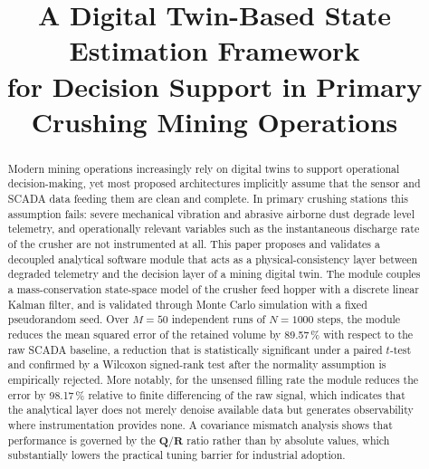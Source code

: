 \documentclass[conference]{IEEEtran}
\begin{document}
\title{A Digital Twin-Based State Estimation Framework\\
for Decision Support in Primary Crushing Mining Operations}

\author{
\and
{}
\and
{}
}

\maketitle

\begin{abstract}
Modern mining operations increasingly rely on digital twins to support
operational decision-making, yet most proposed architectures implicitly assume
that the sensor and SCADA data feeding them are clean and complete. In primary
crushing stations this assumption fails: severe mechanical vibration and
abrasive airborne dust degrade level telemetry, and operationally relevant
variables such as the instantaneous discharge rate of the crusher are not
instrumented at all. This paper proposes and validates a decoupled analytical
software module that acts as a physical-consistency layer between degraded
telemetry and the decision layer of a mining digital twin. The module couples a
mass-conservation state-space model of the crusher feed hopper with a discrete
linear Kalman filter, and is validated through Monte Carlo simulation with a
fixed pseudorandom seed. Over $M=50$ independent runs of $N=1000$ steps, the
module reduces the mean squared error of the retained volume by 89.57\,\% with
respect to the raw SCADA baseline, a reduction that is statistically significant
under a paired $t$-test and confirmed by a Wilcoxon signed-rank test after the
normality assumption is empirically rejected. More notably, for the unsensed
filling rate the module reduces the error by 98.17\,\% relative to finite
differencing of the raw signal, which indicates that the analytical layer does
not merely denoise available data but generates observability where
instrumentation provides none. A covariance mismatch analysis shows that
performance is governed by the $\mathbf{Q}/\mathbf{R}$ ratio rather than by
absolute values, which substantially lowers the practical tuning barrier for
industrial adoption.
\end{abstract}
\end{document}
